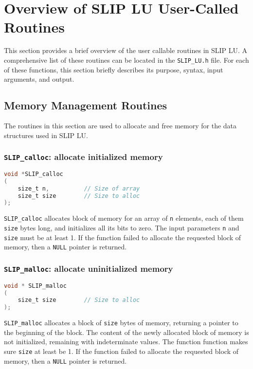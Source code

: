\documentclass[11pt]{article}
\theoremstyle{definition}
\begin{document}
\cprotect\section{Overview of SLIP LU User-Called Routines} \label{s:UserRoutines}

This section provides a brief overview of the user callable routines in SLIP LU. A comprehensive list of these routines can be located in the \verb|SLIP_LU.h| file. For each of these functions, this section briefly describes its purpose, syntax, input arguments, and output.

\subsection{Memory Management Routines} \label{s:user:memmanag}

The routines in this section are used to allocate and free memory for the data structures used in SLIP LU.

\cprotect\subsubsection{\verb|SLIP_calloc|: allocate initialized memory}\label{ss:SLIP_calloc}

\begin{lstlisting}[language=C,frame=single]
void *SLIP_calloc
(
    size_t n,          // Size of array
    size_t size        // Size to alloc
);
\end{lstlisting}

\verb|SLIP_calloc| allocates block of memory for an array of \verb|n| elements, each of them \verb|size| bytes long, and initializes all its bits to zero. The input parameters \verb|n| and \verb|size| must be at least 1. If the function failed to allocate the requested block of memory, then a \verb|NULL| pointer is returned.

\cprotect\subsubsection{\verb|SLIP_malloc|: allocate uninitialized memory}\label{ss:SLIP_malloc}

\begin{lstlisting}[language=C,frame=single]
void * SLIP_malloc
(
    size_t size        // Size to alloc
);
\end{lstlisting}

\verb|SLIP_malloc| allocates a block of \verb|size| bytes of memory, returning a pointer to the beginning of the block. The content of the newly allocated block of memory is not initialized, remaining with indeterminate values. The function function makes sure \verb|size| at least be 1. If the function failed to allocate the requested block of memory, then a \verb|NULL| pointer is returned.
\end{document}
